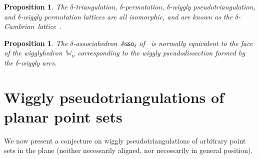 \documentclass[submission]{FPSAC2025}
\newtheorem{proposition}[theorem]{Proposition}
\theoremstyle{definition}
\newcommand{\darkblue}{\color{darkblue}} %
\newcommand{\defn}[1]{\textsl{\darkblue #1}} %
\newcommand{\polytope}[1]{\mathds{#1}} %
\newcommand{\wigglyhedron}{\polytope{W}} %
\newcommand{\Asso}{\polytope{A}\mathsf{sso}} %
\begin{document}
\begin{proposition}
\label{prop:CambrianLattice}
The $\delta$-triangulation, $\delta$-permutation, \mbox{$\delta$-wiggly} pseudotriangulation, and $\delta$-wiggly permutation lattices are all isomorphic, and are known as the \defn{$\delta$-Cambrian~lattice}~\cite{Reading-CambrianLattices}.
\end{proposition}

\begin{proposition}
\label{prop:CambrianFan}
The $\delta$-associahedron~$\Asso_\delta$ of~\cite{HohlwegLange} is normally equivalent to the face of the wigglyhedron~$\wigglyhedron_n$ corresponding to the wiggly pseudodissection formed by the $\delta$-wiggly arcs.
\end{proposition}

\newpage
\section{Wiggly pseudotriangulations of planar point sets}
\label{sec:planarPointSets}

We now present a conjecture on wiggly pseudotriangulations of arbitrary point sets in the plane (neither necessarily aligned, nor necessarily in general position).
\end{document}
